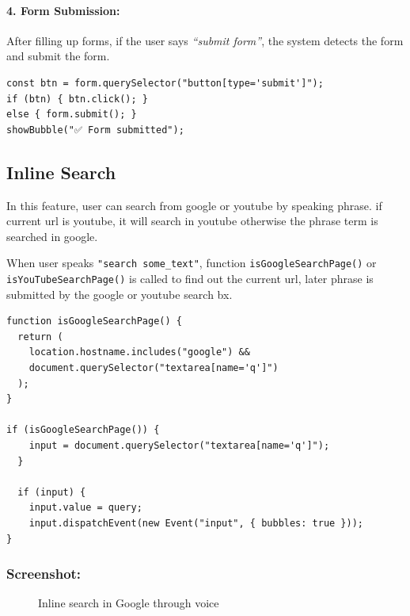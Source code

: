 \paragraph{4. Form Submission:}
After filling up forms, if the user says \textit{``submit form''}, the system detects the form and submit the form.

\begin{verbatim}
const btn = form.querySelector("button[type='submit']");
if (btn) { btn.click(); }
else { form.submit(); }
showBubble("✅ Form submitted");
\end{verbatim}

\subsection{Inline Search}
In this feature, user can search from google or youtube by speaking phrase. if current url is youtube, it will search in youtube otherwise the phrase term is searched in google.

When user speaks \texttt{"search some_text"}, function \texttt{isGoogleSearchPage()} or \texttt{isYouTubeSearchPage()} is called to find out the current url, later phrase is submitted by the google or youtube search bx.

\begin{verbatim}
function isGoogleSearchPage() {
  return (
    location.hostname.includes("google") &&
    document.querySelector("textarea[name='q']")
  );
}

if (isGoogleSearchPage()) {
    input = document.querySelector("textarea[name='q']");
  }

  if (input) {
    input.value = query;
    input.dispatchEvent(new Event("input", { bubbles: true }));
}
\end{verbatim}

\subsubsection*{Screenshot:}
\begin{figure}[H] 
    \centering
    \caption{Inline search in Google through voice}
    \label{fig:inline_search}
\end{figure}

